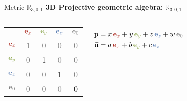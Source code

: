 \begin{frame}{Metric $\mathbb{R}_{3,0,1}$}
    \textbf{3D Projective geometric algebra:} \quad $\mathbb{R}_{3,0,1}$

    \begin{columns}
        \begin{center}
            \begin{tabular}{c|cccc}
                                                  & $\textcolor{red}{\mathbf{e}_x}$ & $\textcolor{green}{\mathbf{e}_y}$ & $\textcolor{blue}{\mathbf{e}_z}$ & $\textcolor{gray}{\mathbf{e}_0}$ \\ \hline
                $\textcolor{red}{\mathbf{e}_x}$   & 1                               & \textcolor{gray}{0}               & \textcolor{gray}{0}              & \textcolor{gray}{0}              \\
                $\textcolor{green}{\mathbf{e}_y}$ & \textcolor{gray}{0}             & 1                                 & \textcolor{gray}{0}              & \textcolor{gray}{0}              \\
                $\textcolor{blue}{\mathbf{e}_z}$  & \textcolor{gray}{0}             & \textcolor{gray}{0}               & 1                                & \textcolor{gray}{0}              \\
                $\textcolor{gray}{\mathbf{e}_0}$  & \textcolor{gray}{0}             & \textcolor{gray}{0}               & \textcolor{gray}{0}              & 0                                \\
            \end{tabular}
        \end{center}

        \begin{align*}
            \mathbf{p}       & = x\,\textcolor{red}{\mathbf{e}_x} + y\,\textcolor{green}{\mathbf{e}_y} + z\,\textcolor{blue}{\mathbf{e}_z} + w\,\textcolor{gray}{\mathbf{e}_0} \\
            \vec{\mathbf{u}} & = a\,\textcolor{red}{\mathbf{e}_x} + b\,\textcolor{green}{\mathbf{e}_y} + c\,\textcolor{blue}{\mathbf{e}_z}
        \end{align*}

    \end{columns}

\end{frame}





